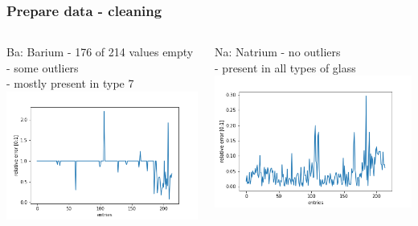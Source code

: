 \documentclass{beamer}
\begin{document}
\begin{frame}
\frametitle{Prepare data - cleaning}
\begin{columns}[T]
    \begin{column}{.5\textwidth}
     \begin{block}{}
     \end{block}
     \begin{block}{Ba: Barium}
	   	- 176 of 214 values empty\\
     	- some outliers\\
     	- mostly present in type 7
        \includegraphics[scale=0.4]{
        figBa.png}
     \end{block}
    \end{column}
    \begin{column}{.5\textwidth}
    \begin{block}{Na: Natrium}
    - no outliers \\
    - present in all types of glass
       \includegraphics[scale=0.4]
       {figNa.png}
    \end{block}
    \end{column}
  \end{columns}
\end{frame}
\end{document}
